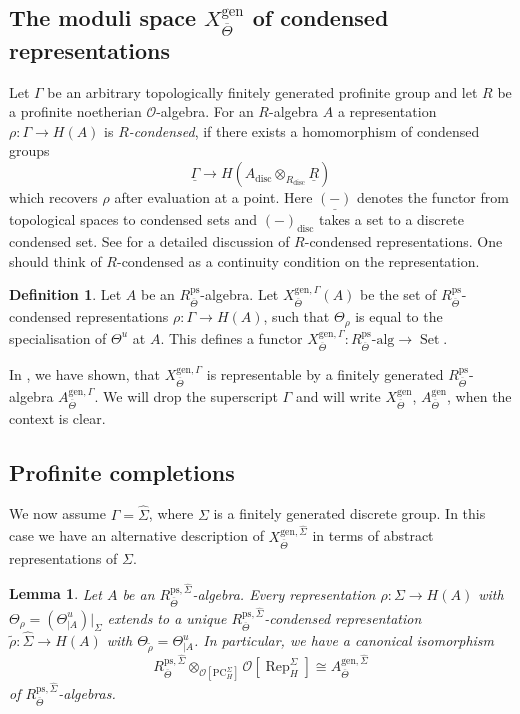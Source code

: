 \documentclass{amsart}
\newtheorem{lem}[prop]{Lemma}
\theoremstyle{definition}
\newtheorem{defi}[prop]{Definition}
\theoremstyle{remark}
\DeclareMathOperator{\Rep}{Rep}
\DeclareMathOperator{\Set}{Set}
\newcommand{\OO}{\mathcal O}
\newcommand{\alg}{\mathrm{alg}}
\newcommand{\gen}{\mathrm{gen}}
\newcommand{\PC}{\mathrm{PC}}
\newcommand{\hyphen}{\text{-}}
\newcommand{\disc}{\operatorname{disc}}
\newcommand{\Thetabar}{\overline{\Theta}}
\newcommand{\ps}{\mathrm{ps}}
\newcommand{\Sigmahat}{\widehat{\Sigma}}
\begin{document}
\subsection{\texorpdfstring{The moduli space $X^{\gen}_{\Thetabar}$ of condensed representations}{The moduli space X gen Thetabar of condensed representations}}
Let $\Gamma$ be an arbitrary topologically finitely generated profinite group and let $R$ be a profinite noetherian $\OO$-algebra. 
For an $R$-algebra $A$ a representation $\rho : \Gamma \to H(A)$ is \emph{$R$-condensed}, if there exists a homomorphism of condensed groups $$\underline{\Gamma} \to H(A_{\disc} \otimes_{R_{\disc}} \underline{R})$$ which recovers $\rho$ after evaluation at a point.
Here $\underline{(-)}$ denotes the functor from topological spaces to condensed sets and $(-)_{\disc}$ takes a set to a discrete condensed set.
See \cite[Section 4]{defG} for a detailed discussion of $R$-condensed representations. One should think 
of $R$-condensed as a continuity condition on the representation. 

\begin{defi}\label{defi_paper}
    Let $A$ be an $R^{\ps}_{\Thetabar}$-algebra.
    Let $X^{\gen, \Gamma}_{\Thetabar}(A)$ be the set of $R^{\ps}_{\Thetabar}$-condensed representations $\rho : \Gamma \to H(A)$, such that $\Theta_{\rho}$ is equal to the specialisation of $\Theta^u$ at $A$.
    This defines a functor $X^{\gen, \Gamma}_{\Thetabar} : R^{\ps}_{\Thetabar}\hyphen\alg \to \Set$.
\end{defi}

In \cite[Proposition 8.3]{defG}, we have shown, that $X^{\gen, \Gamma}_{\Thetabar}$ is representable by a finitely generated $R^{\ps}_{\Thetabar}$-algebra $A^{\gen, \Gamma}_{\Thetabar}$. We will drop the superscript $\Gamma$ and will write $X^{\gen}_{\Thetabar}$, $A^{\gen}_{\Thetabar}$, when the context is clear. 

\subsection{Profinite completions}
We now assume $\Gamma = \Sigmahat$, where $\Sigma$ is a finitely generated discrete group.
In this case we have an alternative description of $X^{\gen, \Sigmahat}_{\Thetabar}$ in terms of abstract representations of $\Sigma$.

\begin{lem}\label{Agen_versus_abstract}
    Let $A$ be an $R^{\ps, \Sigmahat}_{\Thetabar}$-algebra.
    Every representation $\rho : \Sigma \to H(A)$ with $\Theta_{\rho} = (\Theta^u_{|A})|_{\Sigma}$ extends to a unique $R^{\ps, \Sigmahat}_{\Thetabar}$-condensed representation $\widetilde \rho : \Sigmahat \to H(A)$ with $\Theta_{\widetilde \rho} = \Theta^u_{|A}$. In particular, we have a canonical isomorphism
    \begin{equation}\label{iso_Qhat}
    R^{\ps, \Sigmahat}_{\Thetabar} \otimes_{\OO[\PC^\Sigma_H]} \OO[\Rep^\Sigma_H] \cong A^{\gen, \Sigmahat}_{\Thetabar} 
    \end{equation}
    of $R^{\ps, \Sigmahat}_{\Thetabar}$-algebras.
\end{lem}
\end{document}
